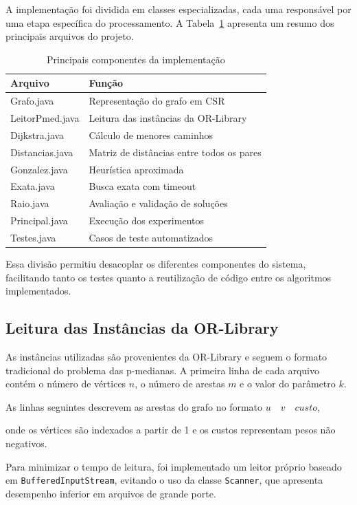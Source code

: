 \documentclass[12pt]{article}
\begin{document}
A implementação foi dividida em classes especializadas, cada uma responsável por uma etapa específica do processamento. A Tabela~\ref{tab:arquivos} apresenta um resumo dos principais arquivos do projeto.

\begin{table}[h] 
\centering 
\caption{Principais componentes da implementação} \label{tab:arquivos} 
\begin{tabular}{ll} 
\hline 
\textbf{Arquivo} & \textbf{Função} \\ 
\hline 
Grafo.java & Representação do grafo em CSR \\ 
LeitorPmed.java & Leitura das instâncias da OR-Library \\ 
Dijkstra.java & Cálculo de menores caminhos \\ 
Distancias.java & Matriz de distâncias entre todos os pares \\ 
Gonzalez.java & Heurística aproximada \\ 
Exata.java & Busca exata com timeout \\ 
Raio.java & Avaliação e validação de soluções \\ 
Principal.java & Execução dos experimentos \\ 
Testes.java & Casos de teste automatizados \\ 
\hline 
\end{tabular} 
\end{table}

Essa divisão permitiu desacoplar os diferentes componentes do sistema, facilitando tanto os testes quanto a reutilização de código entre os algoritmos implementados.

\subsection{Leitura das Instâncias da OR-Library}

As instâncias utilizadas são provenientes da OR-Library e seguem o formato tradicional do problema das p-medianas. A primeira linha de cada arquivo contém o número de vértices $n$, o número de arestas $m$ e o valor do parâmetro $k$.

As linhas seguintes descrevem as arestas do grafo no formato $u \quad v \quad custo$,

onde os vértices são indexados a partir de 1 e os custos representam pesos não negativos.

Para minimizar o tempo de leitura, foi implementado um leitor próprio baseado em \texttt{BufferedInputStream}, evitando o uso da classe \texttt{Scanner}, que apresenta desempenho inferior em arquivos de grande porte.
\end{document}
